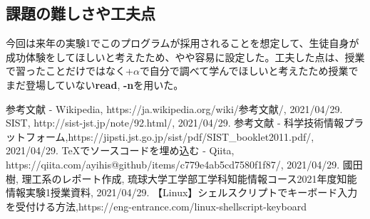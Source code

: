\documentclass[a4paper, 11pt, titlepage]{jsarticle}
\begin{document}
\subsection{課題の難しさや工夫点}
今回は来年の実験1でこのプログラムが採用されることを想定して、生徒自身が成功体験をしてほしいと考えたため、やや容易に設定した。工夫した点は、授業で習ったことだけではなく+$\alpha $で自分で調べて学んでほしいと考えたため授業でまだ登場していない\textbf{read}, \textbf{-n}を用いた。
\newpage
\begin{thebibliography}{99}
 参考文献 - Wikipedia, https://ja.wikipedia.org/wiki/参考文献/,   2021/04/29.
 SIST, http://sist-jst.jp/note/92.html/,   2021/04/29.
参考文献 - 科学技術情報プラットフォーム,https://jipsti.jst.go.jp/sist/pdf/SIST\_booklet2011.pdf/,   2021/04/29.
 TeXでソースコードを埋め込む - Qiita, https://qiita.com/ayihis@github/items/c779e4ab5cd7580f1f87/, 2021/04/29.
 國田樹, 理工系のレポート作成, 琉球大学工学部工学科知能情報コース2021年度知能情報実験1授業資料,  2021/04/29.
【Linux】シェルスクリプトでキーボード入力を受付ける方法,https://eng-entrance.com/linux-shellscript-keyboard
\end{thebibliography}
\end{document}
